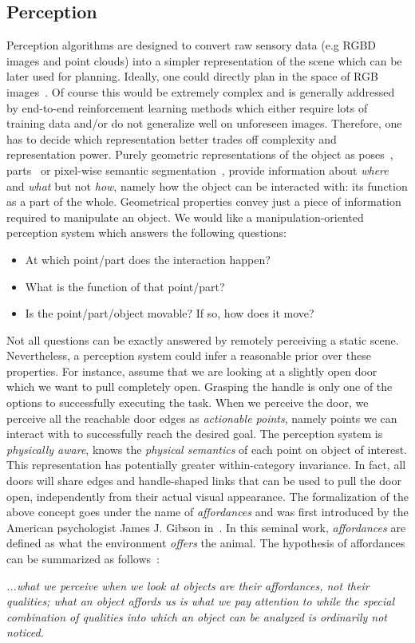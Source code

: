 \subsection{Perception}
Perception algorithms are designed to convert raw sensory data (e.g RGBD images and point clouds) into a simpler representation of the scene which can be later used for planning. Ideally, one could directly plan in the space of RGB images~\cite{levine2016end}. Of course this would be extremely complex and is generally addressed by end-to-end reinforcement learning methods which either require lots of training data and/or do not generalize well on unforeseen images. Therefore, one has to decide which representation better trades off complexity and representation power. Purely geometric representations of the object as poses~\cite{xiang2017posecnn}, parts~\cite{li2020category} or pixel-wise semantic segmentation~\cite{jang2017end}, provide information about \emph{where} and \emph{what} but not \emph{how}, namely how the object can be interacted with: its function as a part of the whole. Geometrical properties convey just a piece of information required to manipulate an object. We would like a manipulation-oriented perception system which answers the following questions:
\begin{itemize}
\item At which point/part does the interaction happen?
\item What is the function of that point/part?
\item Is the point/part/object movable? If so, how does it move?
\end{itemize}     

Not all questions can be exactly answered by remotely perceiving a static scene. Nevertheless, a perception system could infer a reasonable prior over these properties. For instance, assume that we are looking at a slightly open door which we want to pull completely open. Grasping the handle is only one of the options to successfully executing the task. When we perceive the door, we perceive all the reachable door edges as \emph{actionable points}, namely points we can interact with to successfully reach the desired goal. The perception system is \emph{physically aware}, knows the \emph{physical semantics} of each point on object of interest. This representation has potentially greater within-category invariance. In fact, all doors will share edges and handle-shaped links that can be used to pull the door open, independently from their actual visual appearance. The formalization of the above concept goes under the name of \emph{affordances} and was first introduced by the American psychologist James J. Gibson in~\cite{gibson1977theory}. In this seminal work, \emph{affordances} are defined as what the environment \emph{offers} the animal. The hypothesis of affordances can be summarized as follows~\cite{gibson1977theory}:
\begin{displayquote}
\emph{...what we perceive when we look at objects are their affordances, not their qualities; what an object affords us is what we pay attention to while the special combination of qualities into which an object can be analyzed is ordinarily not noticed.} 
\end{displayquote}

